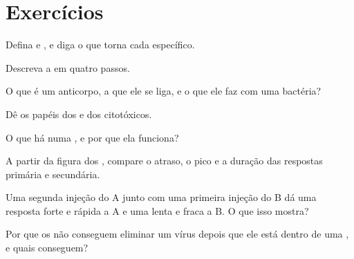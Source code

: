 \section{Exercícios}

\begin{exercise}[$\star$]\label{exo:g12:adaptive-immunity:1}
Defina  e , e diga o que torna cada 
específico.
\end{exercise}

\begin{exercise}[$\star$]\label{exo:g12:adaptive-immunity:2}
Descreva a  em quatro passos.
\end{exercise}

\begin{exercise}[$\star$]\label{exo:g12:adaptive-immunity:3}
O que é um anticorpo, a que ele se liga, e o que ele faz com uma
bactéria?
\end{exercise}

\begin{exercise}[$\star$]\label{exo:g12:adaptive-immunity:4}
Dê os papéis dos  e dos citotóxicos.
\end{exercise}

\begin{exercise}[$\star$]\label{exo:g12:adaptive-immunity:5}
O que há numa , e por que ela funciona?
\end{exercise}

\begin{exercise}[$\star\star$]\label{exo:g12:adaptive-immunity:6}
A partir da figura dos , compare o atraso, o pico e a duração
das respostas primária e secundária.
\end{exercise}

\begin{exercise}[$\star\star$]\label{exo:g12:adaptive-immunity:7}
Uma segunda injeção do  A junto com uma primeira injeção do
 B dá uma resposta forte e rápida a A e uma lenta e fraca a B.
O que isso mostra?
\end{exercise}

\begin{exercise}[$\star\star$]\label{exo:g12:adaptive-immunity:8}
Por que os  não conseguem eliminar um vírus depois que ele
está dentro de uma , e quais  conseguem?
\end{exercise}

